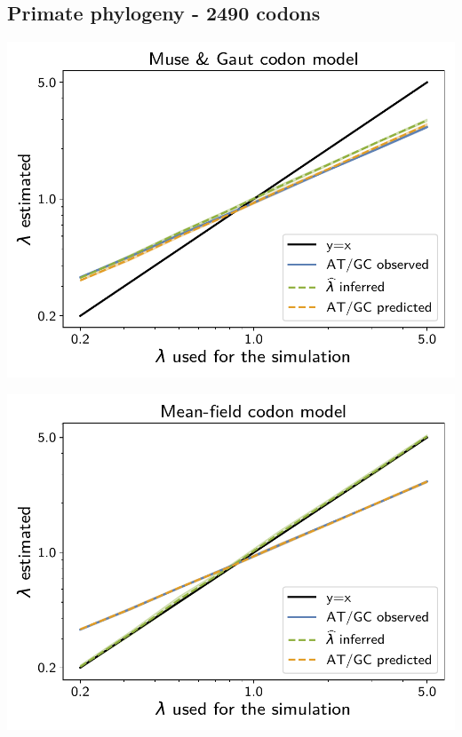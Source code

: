 \documentclass{article}
\begin{document}
\subsection{Primate phylogeny - 2490 codons}

\begin{center}
    \begin{minipage}{0.325\linewidth}
        \includegraphics[width=\linewidth, page=1]{inference_supp_mat/PrimatesExons5Mu1.0_lambda_MG.pdf}
    \end{minipage}
    \hfill
    \begin{minipage}{0.325\linewidth}
        \includegraphics[width=\linewidth, page=1]{inference_supp_mat/PrimatesExons5Mu1.0_lambda_MF.pdf}

\end{minipage}
\end{center}
\end{document}
